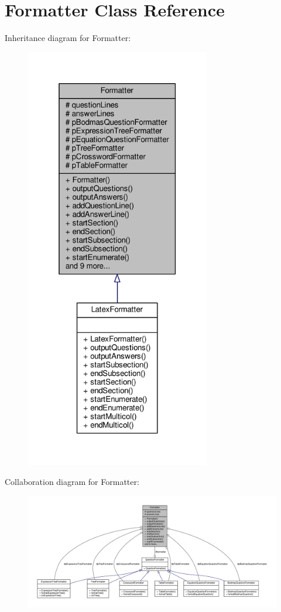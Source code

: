 \hypertarget{classFormatter}{}\section{Formatter Class Reference}
\label{classFormatter}


Inheritance diagram for Formatter\+:
\nopagebreak
\begin{figure}[H]
\begin{center}
\leavevmode
\includegraphics[width=229pt]{classFormatter__inherit__graph}
\end{center}
\end{figure}


Collaboration diagram for Formatter\+:
\nopagebreak
\begin{figure}[H]
\begin{center}
\leavevmode
\includegraphics[width=350pt]{classFormatter__coll__graph}
\end{center}
\end{figure}
